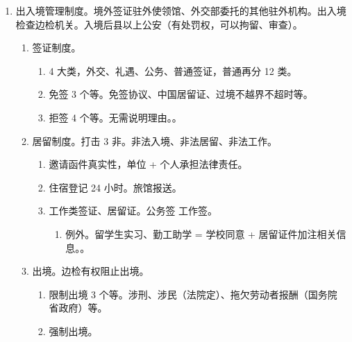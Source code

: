 \begin{enumerate}
\begin{enumerate}
\begin{enumerate}
\begin{enumerate}
                                A、B 两个国籍，A/B/AB 为经居地 \yjt A/B/最密切联系。是这个意思。
                                。
                        \end{enumerate}
                  \item 消极。无国籍看经居地国。
                \end{enumerate}
        \end{enumerate}
  \item 出入境管理制度。境外签证驻外使领馆、外交部委托的其他驻外机构。出入境检查边检机关。入境后县以上公安（有处罚权，可以拘留、审查）。
        \begin{enumerate}
          \item 签证制度。
                \begin{enumerate}
                  \item 4 大类，外交、礼遇、公务、普通签证，普通再分 12 类。
                  \item 免签 3 个等。免签协议、中国居留证、过境不越界不超时等。
                  \item 拒签 4 个等。无需说明理由。。
                \end{enumerate}
          \item 居留制度。打击 3 非。非法入境、非法居留、非法工作。
                \begin{enumerate}
                  \item 邀请函件真实性，单位 + 个人承担法律责任。
                  \item 住宿登记 24 小时。旅馆报送。
                  \item 工作类签证、居留证。公务签 \bdy 工作签。
                        \begin{enumerate}
                          \item 例外。留学生实习、勤工助学 = 学校同意 + 居留证件加注相关信息。。
                        \end{enumerate}
                \end{enumerate}
          \item 出境。边检有权阻止出境。
                \begin{enumerate}
                  \item 限制出境 3 个等。涉刑、涉民（法院定）、拖欠劳动者报酬（国务院 \hz 省政府）等。
                  \item 强制出境。
                        \begin{enumerate}

\end{enumerate}
\end{enumerate}
\end{enumerate}
\end{enumerate}
